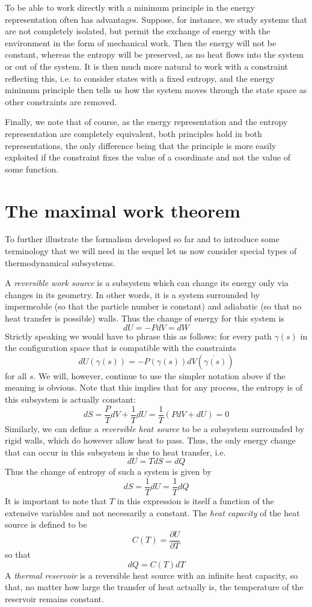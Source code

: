 \documentclass[a4paper, draft]{article}
\theoremstyle{own}
\theoremstyle{remark}
\begin{document}
To be able to work directly with a minimum principle in the energy representation often has advantages. Suppose, for instance, we study systems that are not completely isolated, but permit the exchange of energy with the environment in the form of mechanical work. Then the energy will not be constant, whereas the entropy will be preserved, as no heat flows into the system or out of the system. It is then much more natural to work with a constraint reflecting this, i.e. to consider states with a fixed entropy, and the energy minimum principle then tells us how the system moves through the state space as other constraints are removed.

Finally, we note that of course, as the energy representation and the entropy representation are completely equivalent, both principles hold in both representations, the only difference being that the principle is more easily exploited if the constraint fixes the value of a coordinate and not the value of some function.


\section{The maximal work theorem}

To further illustrate the formalism developed so far and to introduce some terminology that we will need in the sequel let us now consider special types of thermodynamical subsystems. 

A {\em reversible work source} is a subsystem which can change its energy only via changes in its geometry. In other words, it is a system surrounded by impermeable (so that the particle number is constant) and adiabatic (so that no heat transfer is possible) walls. Thus the change of energy for this system is
$$
dU = - P dV = dW
$$
Strictly speaking we would have to phrase this as follows: for every path $\gamma(s)$ in the configuration space that is compatible with the constraints
$$
dU(\gamma(s)) = - P(\gamma(s)) dV(\dot{\gamma(s)})
$$
for all $s$. We will, however, continue to use the simpler notation above if the meaning is obvious. Note that this implies that for any process, the entropy is of this subsystem is actually constant:
$$
dS = \frac{P}{T} dV + \frac{1}{T} dU = \frac{1}{T} (P dV + dU) = 0
$$
Similarly, we can define a {\em reversible heat source} to be a subsystem surrounded by rigid walls, which do however allow heat to pass. Thus, the only energy change that can occur in this subsystem is due to heat transfer, i.e.
$$
dU = T dS = dQ
$$
Thus the change of entropy of such a system is given by
$$
dS = \frac{1}{T} dU = \frac{1}{T} dQ
$$
It is important to note that $T$ in this expression is itself a function of the extensive variables and not necessarily a constant. The {\em heat capacity} of the heat source is defined to be
$$
C(T) = \frac{\partial U}{\partial T}
$$
so that
$$
dQ = C(T) dT
$$
A {\em thermal reservoir} is a reversible heat source with an infinite heat capacity, so that, no matter how large the transfer of heat actually is, the temperature of the reservoir remains constant.
\end{document}
